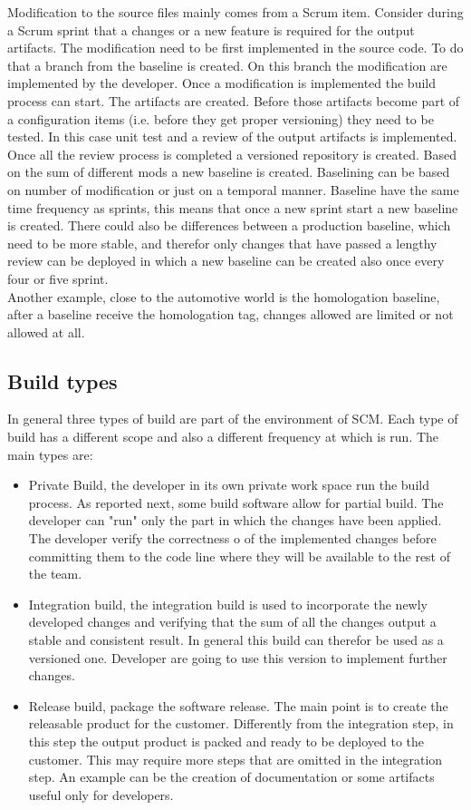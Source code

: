 \documentclass[../main.tex]{subfiles}
\begin{document}
Modification to the source files mainly comes from a Scrum item. Consider during a Scrum sprint that a changes or a new feature is required for the output artifacts. The modification need to be first implemented in the source code. To do that a branch from the baseline is created. On this branch the modification are implemented by the developer. Once a modification is implemented the build process can start. The artifacts are created. Before those artifacts become part of a configuration items (i.e. before they get proper versioning) they need to be tested. In this case unit test and a review of the output artifacts is implemented. Once all the review process is completed a versioned repository is created. Based on the sum of different mods a new baseline is created. Baselining can be based on number of modification or just on a temporal manner. Baseline have the same time frequency as sprints, this means that once a new sprint start a new baseline is created. There could also be differences between a production baseline, which need to be more stable, and therefor only changes that have passed a lengthy review can be deployed in which a new baseline can be created also once every four or five sprint.\\
Another example, close to the automotive world is the homologation baseline, after a baseline receive the homologation tag, changes allowed are limited or not allowed at all. 
\subsection{Build types}
In general three types of build are part of the environment of SCM. Each type of build has a different scope and also a different frequency at which is run. The main types are:
\begin{itemize}
    \item Private Build, the developer in its own private work space run the build process. As reported next, some build software allow for partial build. The developer can "run" only the part in which the changes have been applied. The developer verify the correctness o of the implemented changes before committing them to the code line where they will be available to the rest of the team. 
    \item Integration build, the integration build is used to incorporate the newly developed changes and verifying that the sum of all the changes output a stable and consistent result. In general this build can therefor be used as a versioned one. Developer are going to use this version to implement further changes. 
    \item Release build, package the software release. The main point is to create the releasable product for the customer. Differently from the integration step, in this step the output product is packed and ready to be deployed to the customer. This may require more steps that are omitted in the integration step. An example can be the creation of documentation or some artifacts useful only for developers. 
\end{itemize}
\end{document}
